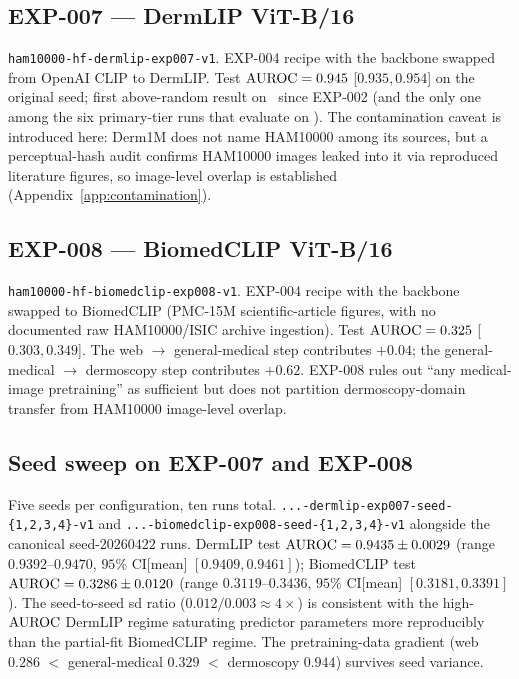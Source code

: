 \subsection{EXP-007 --- DermLIP ViT-B/16}
\label{app:per-run:exp007}
\texttt{ham10000-hf-dermlip-exp007-v1}. EXP-004 recipe with the backbone
swapped from OpenAI CLIP to DermLIP. Test $\mathrm{AUROC} = 0.945$ [$0.935, 0.954$]
on the original seed; first above-random result on \strongholdtwo\ since
EXP-002 (and the only one among the six primary-tier runs that
evaluate on \strongholdtwo). The
contamination caveat is introduced here: Derm1M does not name HAM10000
among its sources, but a perceptual-hash audit confirms HAM10000 images leaked
into it via reproduced literature figures, so image-level overlap is
established (Appendix~\ref{app:contamination}).

\subsection{EXP-008 --- BiomedCLIP ViT-B/16}
\label{app:per-run:exp008}
\texttt{ham10000-hf-biomedclip-exp008-v1}. EXP-004 recipe with the
backbone swapped to BiomedCLIP (PMC-15M scientific-article figures,
with no documented raw HAM10000/ISIC archive ingestion). Test $\mathrm{AUROC} =
0.325$ [$0.303, 0.349$]. The web $\to$ general-medical step contributes
$+0.04$; the general-medical $\to$ dermoscopy step contributes $+0.62$.
EXP-008 rules out ``any medical-image pretraining'' as sufficient but
does not partition dermoscopy-domain transfer from HAM10000 image-level
overlap.

\subsection{Seed sweep on EXP-007 and EXP-008}
\label{app:per-run:seed-sweep}
Five seeds per configuration, ten runs total.
\texttt{...-dermlip-exp007-seed-\{1,2,3,4\}-v1} and
\texttt{...-biomedclip-exp008-seed-\{1,2,3,4\}-v1} alongside the
canonical seed-$20260422$ runs. DermLIP test $\mathrm{AUROC} = 0.9435 \pm 0.0029$
(range $0.9392$--$0.9470$, $95\%$ CI[mean] $[0.9409, 0.9461]$); BiomedCLIP
test $\mathrm{AUROC} = 0.3286 \pm 0.0120$ (range $0.3119$--$0.3436$, $95\%$
CI[mean] $[0.3181, 0.3391]$). The seed-to-seed sd ratio
($0.012 / 0.003 \approx 4\times$) is consistent with the high-$\mathrm{AUROC}$
DermLIP regime saturating predictor parameters more reproducibly than the
partial-fit BiomedCLIP regime. The pretraining-data gradient (web $0.286$
$<$ general-medical $0.329$ $<$ dermoscopy $0.944$) survives seed variance.
